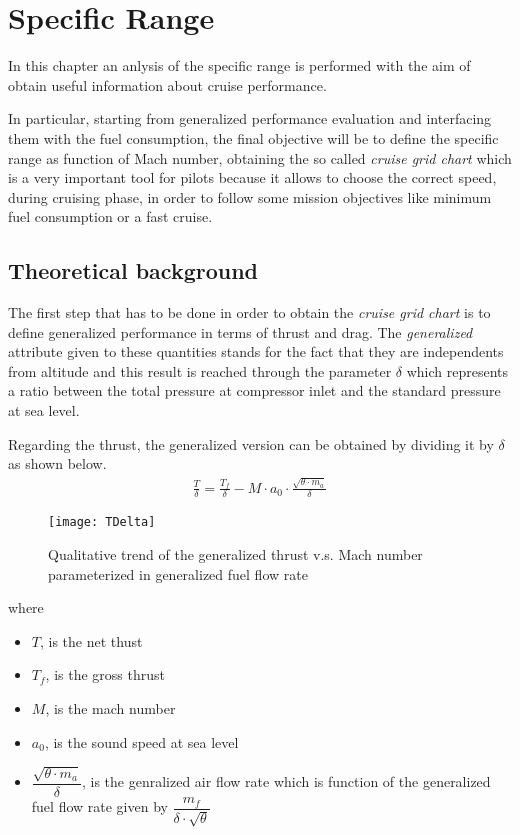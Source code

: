 \chapter{Specific Range}
In this chapter an anlysis of the specific range is performed with the aim of obtain useful information about cruise performance. 

In particular, starting from generalized performance evaluation and interfacing them with the fuel consumption, the final objective will be to define the specific range as function of Mach number, obtaining the so called \emph{cruise grid chart} which is a very important tool for pilots because it allows to choose the correct speed, during cruising phase, in order to follow some mission objectives like minimum fuel consumption or a fast cruise.

\section{Theoretical background}
The first step that has to be done in order to obtain the \emph{cruise grid chart} is to define generalized performance in terms of thrust and drag. The \emph{generalized} attribute given to these quantities stands for the fact that they are independents from altitude and this result is reached through the parameter $\delta$ which represents a ratio between the total pressure at compressor inlet and  the standard pressure at sea level. 

\bigskip
\noindent
Regarding the thrust, the generalized version can be obtained by dividing it by $\delta$ as shown below.
\begin{eqnarray}
\frac{T}{\delta}=\frac{T_{f}}{\delta}-M\cdot a_{0}\cdot \frac{\sqrt{\theta \cdot m_{a}}}{\delta}
\label{eqn:Equation1}
\end{eqnarray}

\begin{figure}[!ht]
\centering
\texttt{[image: TDelta]}
\caption{Qualitative trend of  the generalized thrust v.s. Mach number parameterized in generalized fuel flow rate}
\label{fig:Figure1}
\end{figure}

\noindent
where

\begin{itemize}
\item $T$, is the net thust
\item $T_{f}$, is the gross thrust
\item $M$, is the mach number
\item $a_{0}$, is the sound speed at sea level
\item $\dfrac{\sqrt{\theta \cdot m_{a}}}{\delta}$, is the genralized air flow rate which is function of the generalized fuel flow rate given by $\dfrac{m_{f}}{\delta \cdot \sqrt{\theta}}$
\end{itemize}


